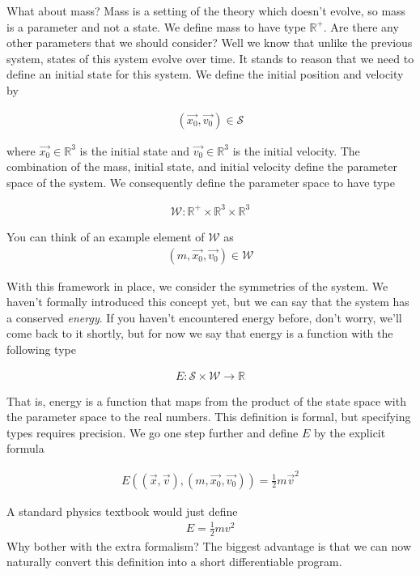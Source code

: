 \documentclass[book.tex]{subfiles}
\begin{document}
What about mass? Mass is a setting of the theory which doesn't evolve, so mass is a parameter and not a state. We define mass to have type $\mathbb{R}^+$. Are there any other parameters that we should consider? Well we know that unlike the previous system, states of this system evolve over time. It stands to reason that we need to define an initial state for this system. We define the initial position and velocity by

\begin{align}
(\vec{x_0}, \vec{v_0}) \in  \mathcal{S}
\end{align}

\noindent where $\vec{x_0} \in \mathbb{R}^3$ is the initial state and $\vec{v_0} \in \mathbb{R}^3$ is the initial velocity. The combination of the mass, initial state, and initial velocity define the parameter space of the system. We consequently define the parameter space to have type

\begin{align}
\mathcal{W} : \mathbb{R}^+ \times \mathbb{R}^3 \times \mathbb{R}^3
\end{align}

\noindent You can think of an example element of $\mathcal{W}$ as
\begin{align}
(m, \vec{x_0}, \vec{v_0}) \in \mathcal{W}
\end{align}

With this framework in place, we consider the symmetries of the system. We haven't formally introduced this concept yet, but we can say that the system has a conserved \textit{energy}. If you haven't encountered energy before, don't worry, we'll come back to it shortly, but for now we say that energy is a function with the following type

\begin{align}
    E: \mathcal{S} \times \mathcal{W} \to \mathbb{R}
\end{align}

That is, energy is a function that maps from the product of the state space with the parameter space to the real numbers. This definition is formal, but specifying types requires precision. We go one step further and define $E$ by the explicit formula

\begin{align}
E\left ((\vec{x}, \vec{v}), (m, \vec{x_0}, \vec{v_0})\right) = \frac{1}{2}m \vec{v}^2
\end{align}

\noindent A standard physics textbook would just define 
\begin{align}E = \tfrac{1}{2}mv^2\end{align}
Why bother with the extra formalism? The biggest advantage is that we can now naturally convert this definition into a short differentiable program.
\end{document}
